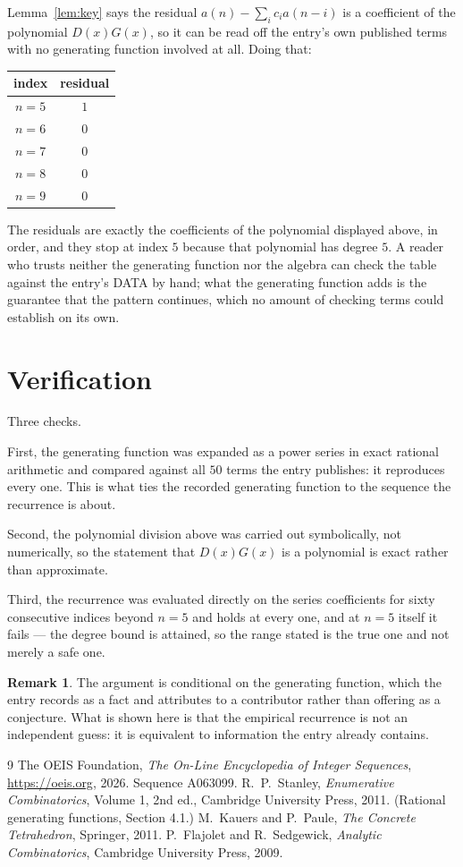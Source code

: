 \documentclass[11pt,a4paper]{article}
\theoremstyle{plain}
\theoremstyle{definition}
\newtheorem{remark}[theorem]{Remark}
\begin{document}
Lemma~\ref{lem:key} says the residual $a(n)-\sum_ic_ia(n-i)$ is a coefficient of the
polynomial $D(x)G(x)$, so it can be read off the entry's own published terms with no
generating function involved at all. Doing that:
\begin{center}
\begin{tabular}{cc}
index & residual \\ \hline
$n=5$ & $1$ \\
$n=6$ & $0$ \\
$n=7$ & $0$ \\
$n=8$ & $0$ \\
$n=9$ & $0$
\end{tabular}
\end{center}
The residuals are exactly the coefficients of the polynomial displayed above, in order, and
they stop at index $5$ because that polynomial has degree $5$. A reader who trusts
neither the generating function nor the algebra can check the table against the entry's DATA
by hand; what the generating function adds is the guarantee that the pattern continues, which
no amount of checking terms could establish on its own.

\section{Verification}

Three checks.

First, the generating function was expanded as a power series in exact rational arithmetic and
compared against all $50$ terms the entry publishes: it reproduces every one. This is
what ties the recorded generating function to the sequence the recurrence is about.

Second, the polynomial division above was carried out symbolically, not numerically, so the
statement that $D(x)G(x)$ is a polynomial is exact rather than approximate.

Third, the recurrence was evaluated directly on the series coefficients for sixty consecutive
indices beyond $n=5$ and holds at every one, and at $n=5$ itself it fails --- the
degree bound is attained, so the range stated is the true one and not merely a safe one.

\begin{remark}
The argument is conditional on the generating function, which the entry records as a fact and
attributes to a contributor rather than offering as a conjecture. What is shown here is that
the empirical recurrence is not an independent guess: it is equivalent to information the
entry already contains.
\end{remark}

\begin{thebibliography}{9}
 The OEIS Foundation, \emph{The On-Line Encyclopedia of Integer
Sequences}, \url{https://oeis.org}, 2026. Sequence A063099.
 R.~P.~Stanley, \emph{Enumerative Combinatorics}, Volume 1, 2nd ed.,
Cambridge University Press, 2011. (Rational generating functions, Section 4.1.)
 M.~Kauers and P.~Paule, \emph{The Concrete Tetrahedron}, Springer, 2011.
 P.~Flajolet and R.~Sedgewick, \emph{Analytic Combinatorics}, Cambridge
University Press, 2009.
\end{thebibliography}
\end{document}
